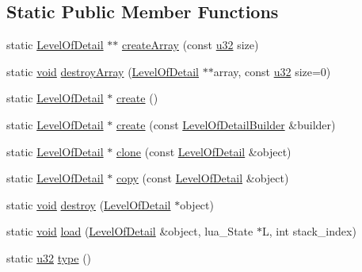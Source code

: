 \subsection*{Static Public Member Functions}
\begin{DoxyCompactItemize}
\item 
static \mbox{\hyperlink{classnjli_1_1_level_of_detail}{Level\+Of\+Detail}} $\ast$$\ast$ \mbox{\hyperlink{classnjli_1_1_level_of_detail_ab8a51c06db961b97b3934fb3a0a5a6c4}{create\+Array}} (const \mbox{\hyperlink{_util_8h_a10e94b422ef0c20dcdec20d31a1f5049}{u32}} size)
\item 
static \mbox{\hyperlink{_thread_8h_af1e856da2e658414cb2456cb6f7ebc66}{void}} \mbox{\hyperlink{classnjli_1_1_level_of_detail_a578947ba5dbc024131ae8fc2e5a8ae36}{destroy\+Array}} (\mbox{\hyperlink{classnjli_1_1_level_of_detail}{Level\+Of\+Detail}} $\ast$$\ast$array, const \mbox{\hyperlink{_util_8h_a10e94b422ef0c20dcdec20d31a1f5049}{u32}} size=0)
\item 
static \mbox{\hyperlink{classnjli_1_1_level_of_detail}{Level\+Of\+Detail}} $\ast$ \mbox{\hyperlink{classnjli_1_1_level_of_detail_ae680727c2c235ebbe7075761220c2607}{create}} ()
\item 
static \mbox{\hyperlink{classnjli_1_1_level_of_detail}{Level\+Of\+Detail}} $\ast$ \mbox{\hyperlink{classnjli_1_1_level_of_detail_afb11a42b8ba72b23c0af91b3feb0f3d0}{create}} (const \mbox{\hyperlink{classnjli_1_1_level_of_detail_builder}{Level\+Of\+Detail\+Builder}} \&builder)
\item 
static \mbox{\hyperlink{classnjli_1_1_level_of_detail}{Level\+Of\+Detail}} $\ast$ \mbox{\hyperlink{classnjli_1_1_level_of_detail_a4e157e2d27cb7e6f2194a8239673a735}{clone}} (const \mbox{\hyperlink{classnjli_1_1_level_of_detail}{Level\+Of\+Detail}} \&object)
\item 
static \mbox{\hyperlink{classnjli_1_1_level_of_detail}{Level\+Of\+Detail}} $\ast$ \mbox{\hyperlink{classnjli_1_1_level_of_detail_a8b9f86076c3a59dbb5785ef7999d0596}{copy}} (const \mbox{\hyperlink{classnjli_1_1_level_of_detail}{Level\+Of\+Detail}} \&object)
\item 
static \mbox{\hyperlink{_thread_8h_af1e856da2e658414cb2456cb6f7ebc66}{void}} \mbox{\hyperlink{classnjli_1_1_level_of_detail_a532c61a6453bc75fff3d1d813a9a904c}{destroy}} (\mbox{\hyperlink{classnjli_1_1_level_of_detail}{Level\+Of\+Detail}} $\ast$object)
\item 
static \mbox{\hyperlink{_thread_8h_af1e856da2e658414cb2456cb6f7ebc66}{void}} \mbox{\hyperlink{classnjli_1_1_level_of_detail_a508687acaa44f29a4b02d91e949800e8}{load}} (\mbox{\hyperlink{classnjli_1_1_level_of_detail}{Level\+Of\+Detail}} \&object, lua\+\_\+\+State $\ast$L, int stack\+\_\+index)
\item 
static \mbox{\hyperlink{_util_8h_a10e94b422ef0c20dcdec20d31a1f5049}{u32}} \mbox{\hyperlink{classnjli_1_1_level_of_detail_abf3736edff218865fabdd0586ae9f581}{type}} ()
\end{DoxyCompactItemize}
